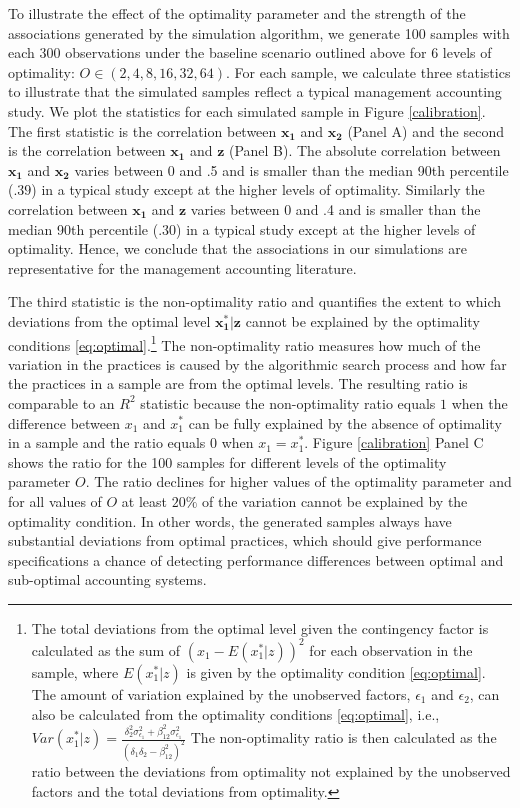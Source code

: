 \documentclass[12pt]{article}
\begin{document}
To illustrate the effect of the optimality parameter and the strength of the associations generated by the simulation algorithm, we generate 100 samples with each 300 observations under the baseline scenario outlined above for 6 levels of optimality: $O \in  (2, 4, 8, 16, 32, 64)$. For each sample, we calculate three statistics to illustrate that the simulated samples reflect a typical management accounting study. We plot the statistics for each simulated sample in Figure \ref{calibration}. The first statistic is the correlation between $\mathbf{x_1}$ and $\mathbf{x_2}$ (Panel A) and the second is the correlation between $\mathbf{x_1}$ and $\mathbf{z}$ (Panel B). The absolute correlation between $\mathbf{x_1}$ and $\mathbf{x_2}$ varies between 0 and .5 and is smaller than the median 90th percentile ($.39$) in a typical study except at the higher levels of optimality. Similarly the correlation between $\mathbf{x_1}$ and $\mathbf{z}$ varies between 0 and .4 and is smaller than the median 90th percentile (.30) in a typical study except at the higher levels of optimality. Hence, we conclude that the associations in our simulations are representative for the management accounting literature. 

The third statistic is the non-optimality ratio and quantifies the extent to which deviations from the optimal level $\mathbf{x^*_1|z}$ cannot be explained by the optimality conditions \eqref{eq:optimal}.\footnote{The total deviations from the optimal level given the contingency factor is calculated as the sum of $(x_1 - E(x_1^*|z))^2$ for each observation in the sample, where $E(x_1^*|z)$ is given by the optimality condition \eqref{eq:optimal}. The amount of variation explained by the unobserved factors, $\epsilon_1$ and $\epsilon_2$, can also be calculated from the optimality conditions \eqref{eq:optimal}, i.e., $Var(x_1^*|z) = \frac{\delta_2^2 \sigma_{\epsilon_1}^2 + \beta_{12}^2 \sigma_{\epsilon_1}^2}{(\delta_1 \delta_2 - \beta_{12}^2)^2}$
The non-optimality ratio is then calculated as the ratio between the deviations from optimality not explained by the unobserved factors and the total deviations from optimality.} The non-optimality ratio measures how much of the variation in the practices is caused by the algorithmic search process and how far the practices in a sample are from the optimal levels. The resulting ratio is comparable to an $R^2$ statistic because the non-optimality ratio equals $1$ when the difference between $x_1$ and $x^*_1$ can be fully explained by the absence of optimality in a sample and the ratio equals $0$ when $x_1 = x^*_1$. Figure \ref{calibration} Panel C shows the ratio for the 100 samples for different levels of the optimality parameter $O$. The ratio declines for higher values of the optimality parameter and for all values of $O$ at least $20\%$ of the variation cannot be explained by the optimality condition. In other words, the generated samples always have substantial deviations from optimal practices, which should give performance specifications a chance of detecting performance differences between optimal and sub-optimal accounting systems. 
\end{document}
